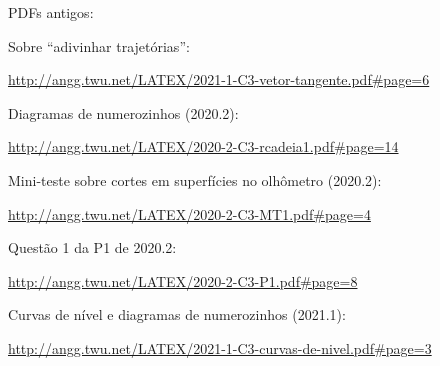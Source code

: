 \documentclass[oneside,12pt]{article}
\begin{document}




PDFs antigos:

\msk

Sobre ``adivinhar trajetórias'':

{\footnotesize

\url{http://angg.twu.net/LATEX/2021-1-C3-vetor-tangente.pdf\#page=6}

}

\msk

Diagramas de numerozinhos (2020.2):

{\footnotesize

\url{http://angg.twu.net/LATEX/2020-2-C3-rcadeia1.pdf\#page=14}

}

\msk

Mini-teste sobre cortes em superfícies no olhômetro (2020.2):

{\footnotesize

\url{http://angg.twu.net/LATEX/2020-2-C3-MT1.pdf\#page=4}

}


\msk

Questão 1 da P1 de 2020.2:

{\footnotesize

\url{http://angg.twu.net/LATEX/2020-2-C3-P1.pdf\#page=8}

}

\msk

Curvas de nível e diagramas de numerozinhos (2021.1):

\ssk

{\footnotesize

\url{http://angg.twu.net/LATEX/2021-1-C3-curvas-de-nivel.pdf#page=3}

}

\ssk





\newpage



\end{document}
